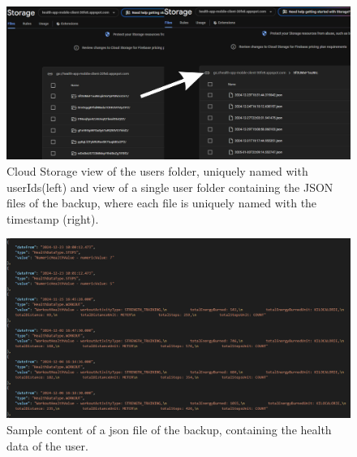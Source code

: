 \begin{figure}
    \includegraphics[width=1.0\linewidth]{./images/backup.jpg}
    \caption{Cloud Storage view of the users folder, uniquely named with userIds(left) and view of a single user folder containing the JSON files of the backup, where each file is uniquely named with the timestamp (right).}
\end{figure}

\begin{figure}
    \centering
    \includegraphics[width=1.0\linewidth]{./images/backup_json.png}
    \caption{Sample content of a json file of the backup, containing the health data of the user.}
\end{figure}
\clearpage
